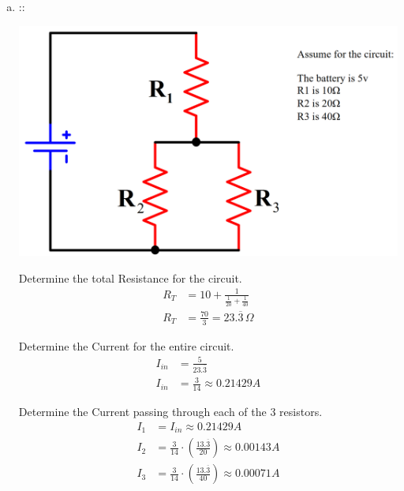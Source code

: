 \documentclass[11pt]{article}
\begin{document}
\begin{enumerate}[a)]
\pagebreak
\item ::
\begin{center}
    \includegraphics[scale=0.2]{4b.png}
\end{center}
Determine the total Resistance for the circuit.
\begin{align*}
    R_T &= 10 + \frac{1}{\frac{1}{20}+\frac{1}{40}} \\
    R_T &= \frac{70}{3} = 23.\overline{3}\,\Omega
\end{align*}

Determine the Current for the entire circuit.
\begin{align*}
    I_{in} &= \frac{5}{23.\overline{3}} \\
    I_{in} &= \frac{3}{14} \approx 0.21429A
\end{align*}

Determine the Current passing through each of the 3 resistors.
\begin{align*}
    I_1 &= I_{in} \approx 0.21429A \\
    I_2 &= \frac{3}{14}\cdot\left(\frac{13.\overline{3}}{20}\right)\approx0.00143A\\
    I_3 &= \frac{3}{14}\cdot\left(\frac{13.\overline{3}}{40}\right)\approx0.00071A
\end{align*}
\end{enumerate}
\pagebreak

\end{document}

